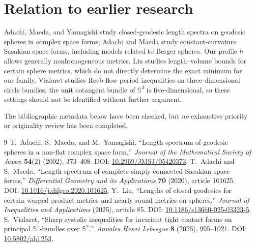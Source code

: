 \documentclass[11pt,a4paper]{article}
\theoremstyle{remark}\newtheorem{remark}[theorem]{Remark}
\newcommand{\Sthree}{\mathbb S^3}\newcommand{\R}{\mathbb R}\newcommand{\C}{\mathbb C}\newcommand{\Z}{\mathbb Z}
\begin{document}
\section{Relation to earlier research}
Adachi, Maeda, and Yamagishi study closed-geodesic length spectra on geodesic spheres in complex space forms; Adachi and Maeda study constant-curvature Sasakian space forms, including models related to Berger spheres. Our profile $h$ allows generally nonhomogeneous metrics. Liu studies length--volume bounds for certain sphere metrics, which do not directly determine the exact minimum for our family. Vialaret studies Reeb-flow period inequalities on three-dimensional circle bundles; the unit cotangent bundle of $\Sthree$ is five-dimensional, so these settings should not be identified without further argument.

The bibliographic metadata below have been checked, but \emph{no} exhaustive priority or originality review has been completed.
\begin{thebibliography}{9}
 T.~Adachi, S.~Maeda, and M.~Yamagishi, ``Length spectrum of geodesic spheres in a non-flat complex space form,'' \emph{Journal of the Mathematical Society of Japan} \textbf{54}(2) (2002), 373--408. DOI: \href{https://doi.org/10.2969/JMSJ/05420373}{10.2969/JMSJ/05420373}.
 T.~Adachi and S.~Maeda, ``Length spectrum of complete simply connected Sasakian space forms,'' \emph{Differential Geometry and its Applications} \textbf{70} (2020), article 101625. DOI: \href{https://doi.org/10.1016/j.difgeo.2020.101625}{10.1016/j.difgeo.2020.101625}.
 Y.~Liu, ``Lengths of closed geodesics for certain warped product metrics and nearly round metrics on spheres,'' \emph{Journal of Inequalities and Applications} (2025), article 85. DOI: \href{https://doi.org/10.1186/s13660-025-03323-5}{10.1186/s13660-025-03323-5}.
 S.~Vialaret, ``Sharp systolic inequalities for invariant tight contact forms on principal $\mathbb S^1$-bundles over $\mathbb S^2$,'' \emph{Annales Henri Lebesgue} \textbf{8} (2025), 995--1021. DOI: \href{https://doi.org/10.5802/ahl.253}{10.5802/ahl.253}.
\end{thebibliography}
\end{document}
